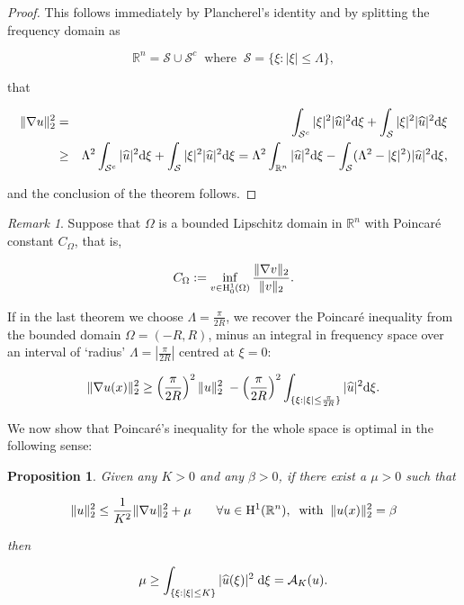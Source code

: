 \documentclass{amsart}
\numberwithin{Theorem}{section}
\numberwithin{equation}{section}
\newtheorem {Proposition}[Theorem]{Proposition}
\theoremstyle{definition}
\theoremstyle{remark}
\newtheorem{Remark}[Theorem]{Remark}
\begin{document}
\begin{proof}

This follows immediately by Plancherel's identity and by splitting the frequency domain as

\[{{\mathbb R}^n} =  \mathcal{S} \cup \mathcal{S}^c \;\; \mbox{where}\;\; \mathcal{S} =\{ \xi :|\xi|\leq \Lambda\}, \]

that

\begin{eqnarray*}
\|\nabla u\|_2^2 &=& \int_{ \mathcal{S}^c} |\xi|^2 |\widehat{u}|^2 {\rm d}\xi +
\int_{ \mathcal{S}}|\xi|^2 |\widehat{u}|^2 {\rm d}\xi\\
&\geq&  \Lambda^2 \int_{ \mathcal{S}^c} |\widehat{u}|^2 {\rm d}\xi  +
\int_{ \mathcal{S}}|\xi|^2 |\widehat{u}|^2 {\rm d}\xi =  \Lambda^2 \int_{{\mathbb R}^n} |\widehat{u}|^2 {\rm d}\xi - \int_{ \mathcal{S}} (\Lambda^2 - |\xi|^2) |\widehat{u}|^2 {\rm d}\xi,
\end{eqnarray*}

and the conclusion of the theorem follows.

\end{proof}

\bigskip

\begin{Remark}

Suppose that $\Omega$ is a bounded Lipschitz domain in $\mathbb{R}^n$ with Poincar\'e constant $C_\Omega$, that is,

\[ C_\Omega := \inf_{v \in {{\rm H}}^1_0(\Omega)} \frac{\|\nabla v\|_2}{\|v\|_2}.\]

If in the last theorem we choose $\Lambda = \frac{\pi}{2R}$,  we recover the Poincar\'e inequality from the bounded domain $\Omega=(-R,R)$, minus an integral in frequency space over an interval of `radius' $\Lambda=  \left|\frac{\pi}{2R}\right|$ centred at $\xi=0$:

\[\|\nabla u(x)\|_2^2
\geq \left(\frac{\pi}{2R}\right)^2\|u\|_2^2 \; - \left(\frac{\pi}{2R}\right)^2\int_{\{\xi:|\xi|\leq \frac{\pi}{2R}\}}  |\widehat{u}|^2 {\rm d}\xi.\]

\end{Remark}

We now show that Poincar\'e's inequality for the whole space is optimal in the following sense:

\begin{Proposition}

Given any $K>0$ and any $\beta >0$, if there exist a $\mu>0$ such that

\[ \|u\|_2^2 \leq \frac{1}{K^2} \|\nabla u \|^2_2 +\mu\qquad \forall u \in {{\rm H}}^1({{\mathbb R}^n}), \;\;\mbox{with}\;\; \|u(x)\|_2^2 =\beta\]

then

\[\mu \geq \int_{\{\xi :|\xi| \leq K \}} |\widehat{u}(\xi)|^2\; {\rm d}\xi= {{\mathcal A}}_{K}(u).\]

\end{Proposition}
\end{document}

